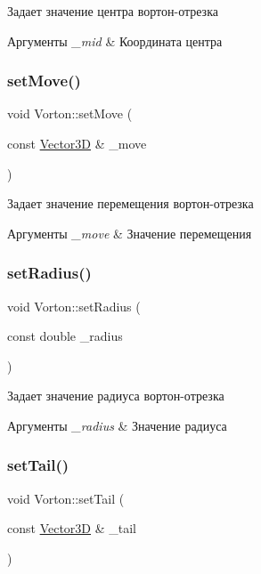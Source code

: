 Задает значение центра вортон-\/отрезка 
\begin{DoxyParams}{Аргументы}
{\em \+\_\+mid} & Координата центра \\
\hline
\end{DoxyParams}
\mbox{\label{class_vorton_ad02474d8833546ada1b6e7b0faaab95c}} 
\subsubsection{\texorpdfstring{set\+Move()}{setMove()}}
{\footnotesize\ttfamily void Vorton\+::set\+Move (\begin{DoxyParamCaption}\item[{const \mbox{\hyperlink{class_vector3_d}{Vector3D}} \&}]{\+\_\+move }\end{DoxyParamCaption})}

Задает значение перемещения вортон-\/отрезка 
\begin{DoxyParams}{Аргументы}
{\em \+\_\+move} & Значение перемещения \\
\hline
\end{DoxyParams}
\mbox{\label{class_vorton_a964e73e592fc49e1a410f9f825cddfdf}} 
\subsubsection{\texorpdfstring{set\+Radius()}{setRadius()}}
{\footnotesize\ttfamily void Vorton\+::set\+Radius (\begin{DoxyParamCaption}\item[{const double}]{\+\_\+radius }\end{DoxyParamCaption})}

Задает значение радиуса вортон-\/отрезка 
\begin{DoxyParams}{Аргументы}
{\em \+\_\+radius} & Значение радиуса \\
\hline
\end{DoxyParams}
\mbox{\label{class_vorton_a3f2b658270131805f1bf8c74ab4947ab}} 
\subsubsection{\texorpdfstring{set\+Tail()}{setTail()}}
{\footnotesize\ttfamily void Vorton\+::set\+Tail (\begin{DoxyParamCaption}\item[{const \mbox{\hyperlink{class_vector3_d}{Vector3D}} \&}]{\+\_\+tail }\end{DoxyParamCaption})}

